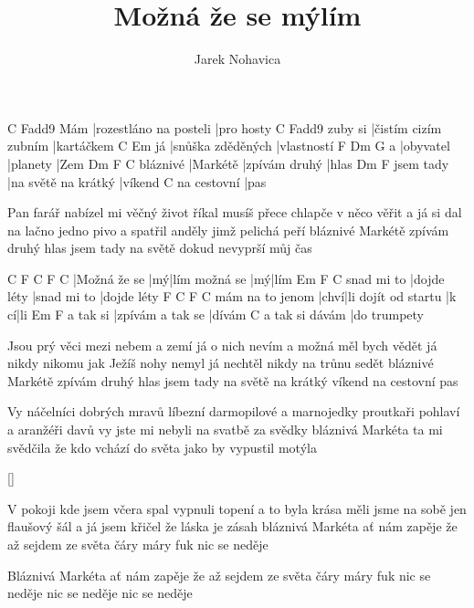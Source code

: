 \documentclass{song}
\author{Jarek Nohavica}
\title{Možná že se mýlím}
\begin{document}

\begin{multicols}{2}

\strophe
    C                      Fadd9
Mám |rozestláno na posteli |pro hosty
        C                    Fadd9
zuby si |čistím cizím zubním |kartáčkem
   C                 Em
já |snůška zděděných |vlastností
  F         Dm       G
a |obyvatel |planety |Zem
         Dm       F             C
bláznivé |Markétě |zpívám druhý |hlas
          Dm                  F
jsem tady |na světě na krátký |víkend
            C
na cestovní |pas
\endstrophe

\strophe*
Pan farář nabízel mi věčný život
říkal musíš přece chlapče v něco věřit
a já si dal na lačno jedno pivo
a spatřil anděly jimž pelichá peří
bláznivé Markétě zpívám druhý hlas
jsem tady na světě dokud nevyprší
můj čas
\endstrophe

C            F  C             F  C
|Možná že se |mý|lím možná se |mý|lím
           Em          F           C
snad mi to |dojde léty |snad mi to |dojde léty
                F    C                   F    C
mám na to jenom |chví|li dojít od startu |k cí|li
         Em               F
a tak si |zpívám a tak se |dívám
               C
a tak si dávám |do trumpety
\endstrophe

\columnbreak

\strophe*
Jsou prý věci mezi nebem a zemí
já o nich nevím a možná měl bych vědět
já nikdy nikomu jak Ježíš nohy nemyl
já nechtěl nikdy na trůnu sedět
bláznivé Markétě zpívám druhý hlas
jsem tady na světě na krátký víkend
na cestovní pas
\endstrophe

\strophe*
Vy náčelníci dobrých mravů
líbezní darmopilové a marnojedky
proutkaři pohlaví a aranžéři davů
vy jste mi nebyli na svatbě za svědky
bláznivá Markéta ta mi svědčila
že kdo vchází do světa jako by vypustil
motýla
\endstrophe

\ref{}

\strophe*
V pokoji kde jsem včera spal
vypnuli topení a to byla krása
měli jsme na sobě jen flaušový šál
a já jsem křičel že láska je zásah
bláznivá Markéta ať nám zapěje
že až sejdem ze světa čáry máry fuk
nic se neděje
\endstrophe

\strophe*
Bláznivá Markéta
ať nám zapěje
že až sejdem ze světa
čáry máry fuk
nic se neděje
nic se neděje
nic se neděje
\endstrophe

\end{multicols}

\end{document}
